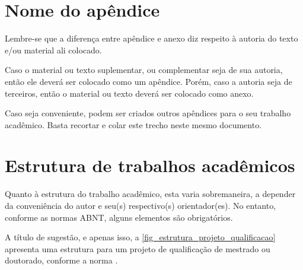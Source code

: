 
\begin{apendicesenv}
    \partapendices


    \chapter{Nome do apêndice}
    \label{chap_apendice_a}

    Lembre-se que a diferença entre apêndice e anexo diz respeito à autoria do texto e/ou material ali colocado.

    Caso o material ou texto suplementar, ou complementar seja de sua autoria, então ele deverá ser colocado como um apêndice.
    Porém, caso a autoria seja de terceiros, então o material ou texto deverá ser colocado como anexo.

    Caso seja conveniente, podem ser criados outros apêndices para o seu trabalho acadêmico.
    Basta recortar e colar este trecho neste mesmo documento.


    \chapter{Estrutura de trabalhos acadêmicos}
    \label{chap_estrutura_de_trabalhos_academicos}

    Quanto à estrutura do trabalho acadêmico, esta varia sobremaneira, a depender da conveniência do autor e seu(s) respectivo(s) orientador(es).
    No entanto, conforme as normas ABNT, alguns elementos são obrigatórios.

    A título de sugestão, e apenas isso, a \autoref{fig_estrutura_projeto_qualificacao} apresenta uma estrutura para um projeto de qualificação de mestrado ou doutorado, conforme a norma .


\end{apendicesenv}
